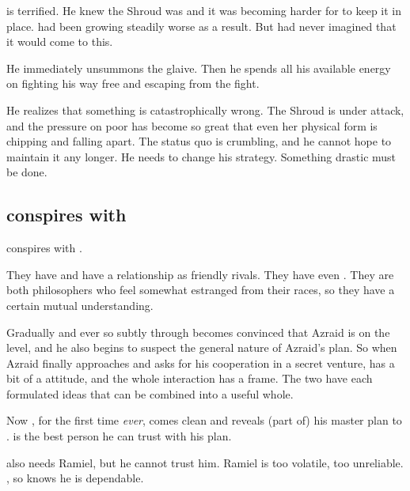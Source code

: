 \Ishnaruchaefir{} is terrified. 
He knew the Shroud was  and it was becoming harder for \Rystessakhin{} to keep it in place. 
 had been growing steadily worse as a result. 
But had never imagined that it would come to this. 

He immediately unsummons the glaive. 
Then he spends all his available energy on fighting his way free and escaping from the fight. 

He realizes that something is catastrophically wrong. 
The Shroud is under attack, and the pressure on poor \Rystessakhin{} has become so great that even her physical form is chipping and falling apart. 
The status quo is crumbling, and he cannot hope to maintain it any longer. 
He needs to change his strategy.
Something drastic must be done. 








\subsection{\Azraid conspires with \Ishnaruchaefir}
\Azraid{} conspires with \Ishnaruchaefir. 

They have  and have a relationship as friendly rivals. 
They have even . 
They are both philosophers who feel somewhat estranged from their races, so they have a certain mutual understanding. 

Gradually and ever so subtly through  \Ishnaruchaefir becomes convinced that Azraid is on the level, and he also begins to suspect the general nature of Azraid's plan. 
So when Azraid finally approaches \Ishnaruchaefir and asks for his cooperation in a secret venture, \Ishnaruchaefir has a bit of a  attitude, and the whole interaction has a  frame.
The two have each formulated ideas that can be combined into a useful whole.

Now \Azraid{}, for the first time \emph{ever}, comes clean and reveals (part of) his master plan to \Ishnaruchaefir. 
\Ishnaruchaefir{} is the best person he can trust with his plan. 

\Azraid{} also needs Ramiel, but he cannot trust him.
Ramiel is too volatile, too unreliable. 
\Ishnaruchaefir{} , so \Azraid{} knows he is dependable.

